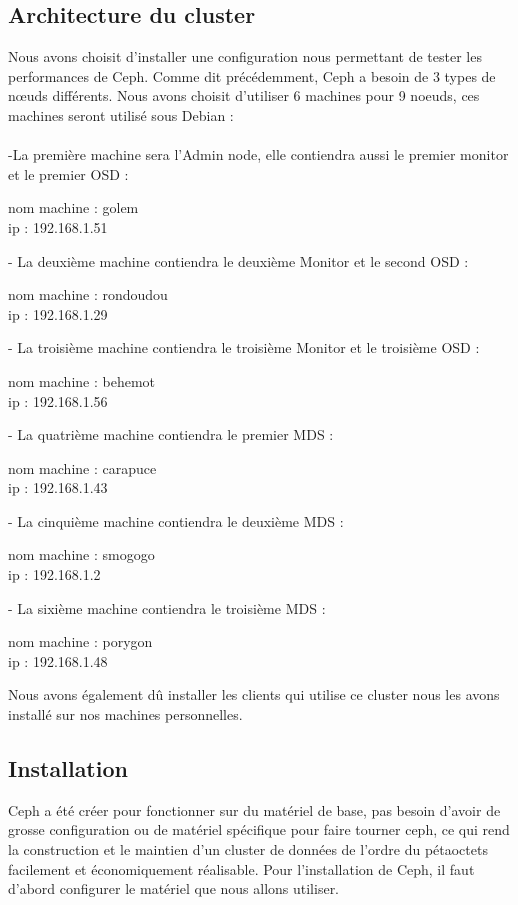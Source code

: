 \documentclass{article}
\begin{document}
	\subsection{Architecture du cluster}
	Nous avons choisit d'installer une configuration nous permettant de tester les performances de Ceph. Comme dit précédemment, Ceph a besoin de 3 types de nœuds différents. Nous avons choisit d'utiliser 6 machines pour 9 noeuds, ces machines seront utilisé sous Debian :
\\\\-La première machine sera l'Admin node, elle contiendra aussi le premier monitor et le premier OSD :

nom machine : golem
\\ip : 192.168.1.51

- La deuxième machine contiendra le deuxième Monitor et le second OSD :

nom machine : rondoudou 
\\ip :  192.168.1.29

- La troisième machine contiendra le troisième Monitor et le troisième OSD :

nom machine : behemot
\\ip :    192.168.1.56

- La quatrième machine contiendra le premier MDS :

nom machine : carapuce 
\\ip : 192.168.1.43

- La cinquième machine contiendra le deuxième MDS :

nom machine : smogogo
\\ip : 192.168.1.2

- La sixième machine contiendra le troisième MDS :

nom machine : porygon
\\ip : 192.168.1.48

Nous avons également dû installer les clients qui utilise ce cluster nous les avons installé sur nos machines personnelles.

	\subsection{Installation}
	
	Ceph a été créer pour fonctionner sur du matériel de base, pas besoin d'avoir de grosse configuration ou de matériel spécifique pour faire tourner ceph, ce qui rend la construction et le maintien d'un cluster de données de l'ordre du pétaoctets facilement et économiquement réalisable.
	Pour l'installation de Ceph, il faut d'abord configurer le matériel que nous allons utiliser.
\end{document}
